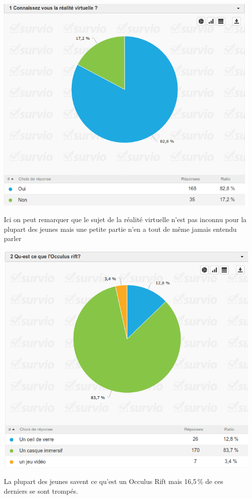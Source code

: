 \documentclass[12pt, a4paper]{report}
\begin{document}
\begin{center}
\includegraphics[scale=0.5]{1.png}

Ici on peut remarquer que le sujet de la réalité virtuelle n'est pas inconnu pour la plupart des jeunes mais une petite partie n'en a tout de même jamais entendu parler
\end{center}

\begin{center}
\includegraphics[scale=0.5]{2.png}

La plupart des jeunes savent ce qu'est un Occulus Rift mais 16,5\,\% de ces derniers se sont trompés.
\end{center}
\end{document}
